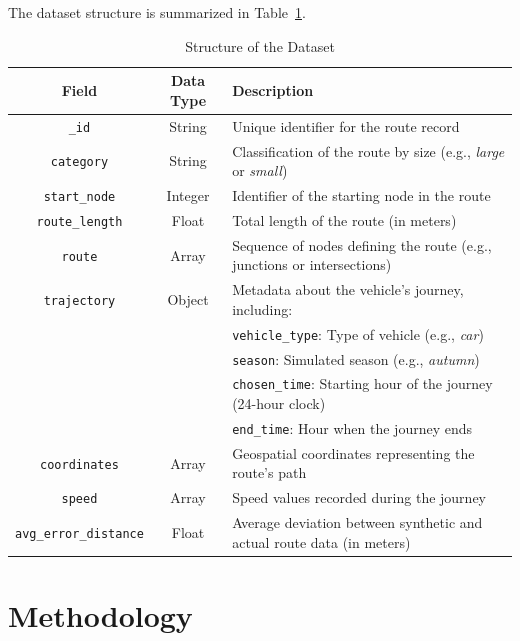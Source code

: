 \documentclass[sigplan,screen]{acmart}
\begin{document}
The dataset structure is summarized in Table~\ref{tab:dataset-structure}.

\begin{table}[h!]
\centering
\caption{Structure of the Dataset}
\label{tab:dataset-structure}
\begin{tabular}{|c|c|l|}
\hline
\textbf{Field} & \textbf{Data Type} & \textbf{Description} \\ \hline
\texttt{\_id} & String & Unique identifier for the route record \\ \hline
\texttt{category} & String & Classification of the route by size (e.g., \textit{large} or \textit{small}) \\ \hline
\texttt{start\_node} & Integer & Identifier of the starting node in the route \\ \hline
\texttt{route\_length} & Float & Total length of the route (in meters) \\ \hline
\texttt{route} & Array & Sequence of nodes defining the route (e.g., junctions or intersections) \\ \hline
\texttt{trajectory} & Object & Metadata about the vehicle's journey, including: \\
& & \hspace{1em} \texttt{vehicle\_type}: Type of vehicle (e.g., \textit{car}) \\
& & \hspace{1em} \texttt{season}: Simulated season (e.g., \textit{autumn}) \\
& & \hspace{1em} \texttt{chosen\_time}: Starting hour of the journey (24-hour clock) \\
& & \hspace{1em} \texttt{end\_time}: Hour when the journey ends \\ \hline
\texttt{coordinates} & Array & Geospatial coordinates representing the route's path \\ \hline
\texttt{speed} & Array & Speed values recorded during the journey \\ \hline
\texttt{avg\_error\_distance} & Float & Average deviation between synthetic and actual route data (in meters) \\ \hline
\end{tabular}
\end{table}

\section{Methodology}
\end{document}
